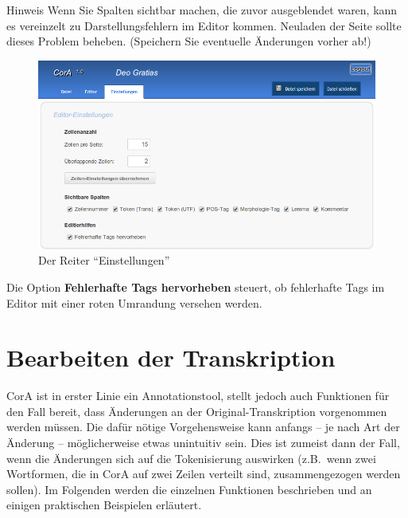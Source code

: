 \documentclass[11pt,a4paper,parskip=half]{scrartcl}
\begin{document}
\begin{infobox}{Hinweis}
  Wenn Sie Spalten sichtbar machen, die zuvor ausgeblendet waren, kann
  es vereinzelt zu Darstellungsfehlern im Editor kommen.  Neuladen der
  Seite sollte dieses Problem beheben.  (Speichern Sie eventuelle
  Änderungen vorher ab!)
\end{infobox}

\begin{figure}
  \centering
  \includegraphics[width=\linewidth]{img/settings.png}
  \caption{Der Reiter "`Einstellungen"'}
  \label{fig:settings}
\end{figure}

Die Option \textbf{Fehlerhafte Tags hervorheben} steuert, ob
fehlerhafte Tags im Editor mit einer roten Umrandung versehen werden.

\newpage
\section{Bearbeiten der Transkription}
\label{sec:bearbeiten}

CorA ist in erster Linie ein Annotationstool, stellt jedoch auch
Funktionen für den Fall bereit, dass Änderungen an der
Original-Transkription vorgenommen werden müssen.  Die dafür nötige
Vorgehensweise kann anfangs -- je nach Art der Änderung --
möglicherweise etwas unintuitiv sein.  Dies ist zumeist dann der Fall,
wenn die Änderungen sich auf die Tokenisierung auswirken (z.B.\ wenn
zwei Wortformen, die in CorA auf zwei Zeilen verteilt sind,
zusammengezogen werden sollen).  Im Folgenden werden die einzelnen
Funktionen beschrieben und an einigen praktischen Beispielen
erläutert.
\end{document}
